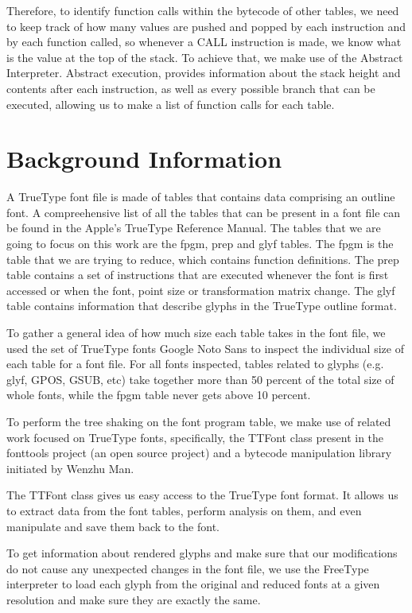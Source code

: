 \documentclass[12pt]{article}
\begin{document}
Therefore, to identify function calls within the bytecode of other tables,
we need to keep track of how many values are pushed and popped by each
instruction and by each function called, so whenever a CALL instruction
is made, we know what is the value at the top of the stack. To achieve
that, we make use of the Abstract Interpreter\cite{bytecode}. Abstract
execution, provides information about the stack height and contents
after each instruction, as well as every possible branch that can be
executed, allowing us to make a list of function calls for each table. 


\section{Background Information}

A TrueType font file is made of tables that contains data comprising an
outline font. A compreehensive list of all the tables that can be
present in a font file can be found in the Apple's TrueType Reference
Manual\cite{ttmanual}. The tables that we are going to focus on this
work are the fpgm, prep and glyf tables. The fpgm is the table that we
are trying to reduce, which contains function definitions. The prep
table contains a set of instructions that are executed whenever the font
is first accessed or when the font, point size or transformation matrix
change. The glyf table contains information that describe glyphs in the
TrueType outline format.

To gather a general idea of how much size each table takes in the font
file, we used the set of TrueType fonts Google Noto Sans\cite{notosans}
to inspect the individual size of each table for a font file. For all
fonts inspected, tables related to glyphs (e.g. glyf, GPOS, GSUB, etc)
take together more than 50 percent of the total size of whole fonts,
while the fpgm table never gets above 10 percent.  

To perform the tree shaking on the font program table,
we make use of related work focused on TrueType fonts, specifically,
the TTFont class present in the fonttools project \cite{fonttools} 
(an open source project) and a bytecode manipulation library
\cite{bytecode} initiated by Wenzhu Man. 

The TTFont class gives us easy access to the TrueType font format. It
allows us to extract data from the font tables, perform analysis on
them, and even manipulate and save them back to the font. 

To get information about rendered glyphs and make sure that
our modifications do not cause any unexpected changes in the font file,
we use the FreeType interpreter to load each glyph from the original
and reduced fonts at a given resolution and make sure they are exactly
the same. 
\end{document}
